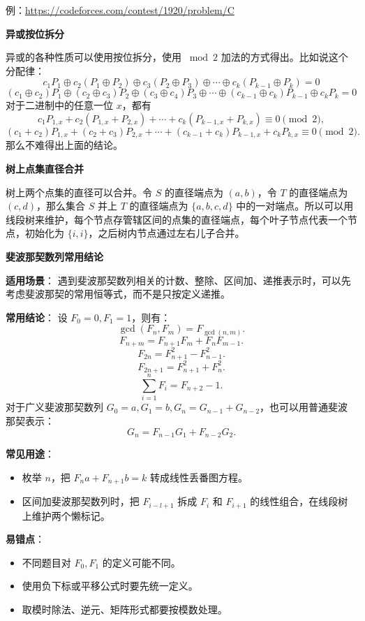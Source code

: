 例：\url{https://codeforces.com/contest/1920/problem/C}

\par\medskip\noindent\textbf{异或按位拆分}\par\smallskip
异或的各种性质可以使用按位拆分，使用 $\bmod 2$ 加法的方式得出。比如说这个分配律：
\[
c_1 P_1 \oplus c_2(P_1 \oplus P_2) \oplus c_3(P_2 \oplus P_3) \oplus \cdots \oplus c_k(P_{k-1} \oplus P_k) = 0
\]
\[
(c_1 \oplus c_2)P_1 \oplus (c_2 \oplus c_3)P_2 \oplus (c_3 \oplus c_4)P_3 \oplus \cdots \oplus (c_{k-1} \oplus c_k)P_{k-1} \oplus c_k P_k = 0
\]
对于二进制中的任意一位 $x$，都有
\[
c_1 P_{1,x} + c_2(P_{1,x} + P_{2,x}) + \cdots + c_k(P_{k-1,x} + P_{k,x}) \equiv 0 \pmod 2,
\]
\[
(c_1 + c_2)P_{1,x} + (c_2 + c_3)P_{2,x} + \cdots + (c_{k-1} + c_k)P_{k-1,x} + c_k P_{k,x} \equiv 0 \pmod 2.
\]
那么不难得出上面的结论。

\par\medskip\noindent\textbf{树上点集直径合并}\par\smallskip
树上两个点集的直径可以合并。令 $S$ 的直径端点为 $(a,b)$，令 $T$ 的直径端点为 $(c,d)$，那么集合 $S$ 并上 $T$ 的直径端点为 $\{a,b,c,d\}$ 中的一对端点。所以可以用线段树来维护，每个节点存管辖区间的点集的直径端点，每个叶子节点代表一个节点，初始化为 $\{i,i\}$，之后树内节点通过左右儿子合并。

\par\medskip\noindent\textbf{斐波那契数列常用结论}\par\smallskip

\textbf{适用场景}：
遇到斐波那契数列相关的计数、整除、区间加、递推表示时，可以先考虑斐波那契的常用恒等式，而不是只按定义递推。

\textbf{常用结论}：
设 $F_0=0,F_1=1$，则有：
\[
\gcd(F_n,F_m)=F_{\gcd(n,m)}.
\]
\[
F_{n+m}=F_{n+1}F_m+F_nF_{m-1}.
\]
\[
F_{2n}=F_{n+1}^2-F_{n-1}^2.
\]
\[
F_{2n+1}=F_{n+1}^2+F_n^2.
\]
\[
\sum_{i=1}^n F_i=F_{n+2}-1.
\]
对于广义斐波那契数列 $G_0=a,G_1=b,G_n=G_{n-1}+G_{n-2}$，也可以用普通斐波那契表示：
\[
G_n=F_{n-1}G_1+F_{n-2}G_2.
\]

\textbf{常见用途}：
\begin{itemize}
  \item 枚举 $n$，把 $F_na+F_{n+1}b=k$ 转成线性丢番图方程。
  \item 区间加斐波那契数列时，把 $F_{i-l+1}$ 拆成 $F_i$ 和 $F_{i+1}$ 的线性组合，在线段树上维护两个懒标记。
\end{itemize}

\textbf{易错点}：
\begin{itemize}
  \item 不同题目对 $F_0,F_1$ 的定义可能不同。
  \item 使用负下标或平移公式时要先统一定义。
  \item 取模时除法、逆元、矩阵形式都要按模数处理。
\end{itemize}


